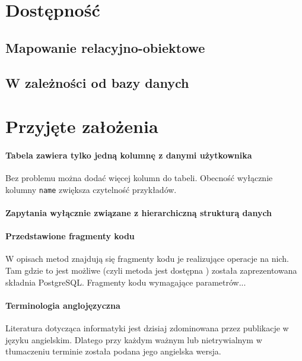 \section{Dostępność}
\subsection{Mapowanie relacyjno-obiektowe}
\subsection{W zależności od bazy danych}


\section{Przyjęte założenia}

\paragraph{Tabela zawiera tylko jedną kolumnę z danymi użytkownika} 
Bez problemu można dodać więcej kolumn do tabeli. Obecność wyłącznie kolumny \texttt{name} zwiększa czytelność przykładów.
\paragraph{Zapytania wyłącznie związane z hierarchiczną strukturą danych} 

\paragraph{Przedstawione fragmenty kodu} 
W opisach metod znajdują się fragmenty kodu je realizujące operacje na nich. 
Tam gdzie to jest możliwe (czyli metoda jest dostępna ) została zaprezentowana składnia PostgreSQL.
Fragmenty kodu  wymagające parametrów...


\paragraph{Terminologia anglojęzyczna} 
Literatura dotycząca informatyki jest dzisiaj zdominowana przez publikacje w języku angielskim. Dlatego przy każdym ważnym lub nietrywialnym w tłumaczeniu terminie została podana jego angielska wersja. 

